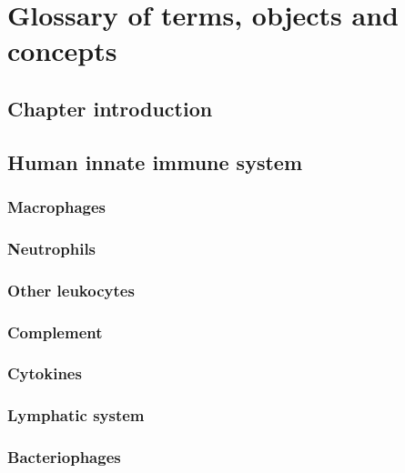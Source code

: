 




\chapter{Glossary of terms, objects and concepts}





\section{Chapter introduction}



\section*{Human innate immune system}


\subsection*{Macrophages}


\subsection*{Neutrophils}


\subsection*{Other leukocytes}


\subsection*{Complement}


\subsection*{Cytokines}


\subsection*{Lymphatic system}



\subsection*{Bacteriophages}









